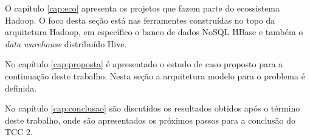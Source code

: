 O capítulo \ref{cap:eco} apresenta os projetos que fazem parte do ecossistema Hadoop. O foco desta seção está nas ferramentes construídas no topo da arquitetura Hadoop, em específico o banco de dados NoSQL HBase e também o \textit{data warehouse} distribuído Hive.

No capítulo \ref{cap:proposta} é apresentado o estudo de caso proposto para a continuação deste trabalho. Nesta seção a arquitetura modelo para o problema é definida.

No capítulo \ref{cap:conclusao} são discutidos os resultados obtidos após o término deste trabalho, onde são apresentados os próximos passos para a conclusão do TCC 2.

